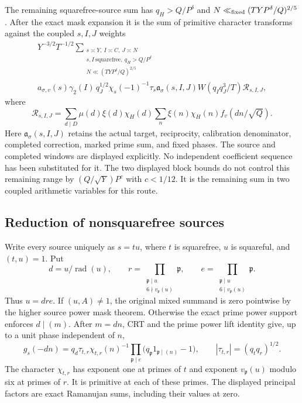 \documentclass[11pt]{article}
\begin{document}
The remaining squarefree-source sum has $q_H>Q/P^\delta$ and
$N\ll_{\rm fixed}(TY P^\delta/Q)^{2/5}$.
After the exact mask expansion
it is the sum of primitive character transforms against the coupled
$s,I,J$ weights
\begin{multline*}
 Y^{-3/2}T^{-1/2}\sum_{\substack{s\asymp Y,\ I\asymp C,\ J\asymp N\\
                   s,I\ \mathrm{squarefree},\ q_H>Q/P^\delta\\
                   N\ll(TYP^\delta/Q)^{2/5}}} \\
 a_{\sigma,v}(s)\gamma_2(I)\,q_J^{1/2}\chi_s(-1)^{-1}\tau_s
     \mathfrak a_\sigma(s,I,J)W(q_Iq_J^3/T)
     \mathcal R_{s,I,J},
\end{multline*}
where
\[
 \mathcal R_{s,I,J}=
     \sum_{d\mid D}\mu(d)\xi(d)\chi_H(d)
        \sum_n\xi(n)\chi_H(n)f_v(dn/\sqrt Q).
\]
Here $\mathfrak a_\sigma(s,I,J)$ retains the actual target, reciprocity,
calibration denominator, completed correction, marked prime sum, and
fixed phases. The source and completed windows are displayed explicitly.
No independent coefficient sequence has been substituted
for it. The two displayed block bounds do not control this remaining
range by $(Q/\sqrt Y)P^c$ with $c<1/12$.
It is the remaining sum in two coupled arithmetic variables for this route.

\subsection{Reduction of nonsquarefree sources}

Write every source uniquely as $s=t u$, where $t$ is squarefree, $u$ is
squareful, and $(t,u)=1$. Put
\[
 d=u/\operatorname{rad}(u),\qquad
 r=\prod_{\substack{\mathfrak p\mid u\\6\nmid v_{\mathfrak p}(u)}}\mathfrak p,
 \qquad
 e=\prod_{\substack{\mathfrak p\mid u\\6\mid v_{\mathfrak p}(u)}}\mathfrak p.
\]
Thus $u=d r e$. If $(u,A)\ne1$, the original mixed summand is zero
pointwise by the higher source power mask theorem.
Otherwise the exact prime power support enforces $d\mid(m)$.
After $m=d n$, CRT and the prime power lift identity give, up to a unit
phase independent of $n$,
\[
 g_s(-d n)
 =q_d\tau_{t,r}\chi_{t,r}(n)^{-1}
       \prod_{\mathfrak p\mid e}
          \bigl(q_{\mathfrak p}1_{\mathfrak p\mid(n)}-1\bigr),
 \qquad |\tau_{t,r}|=(q_tq_r)^{1/2}.
\]
The character $\chi_{t,r}$ has exponent one at primes of $t$ and
exponent $v_{\mathfrak p}(u)$ modulo six at primes of $r$.
It is primitive at each of these primes. The displayed principal factors
are exact Ramanujan sums, including their values at zero.
\end{document}
